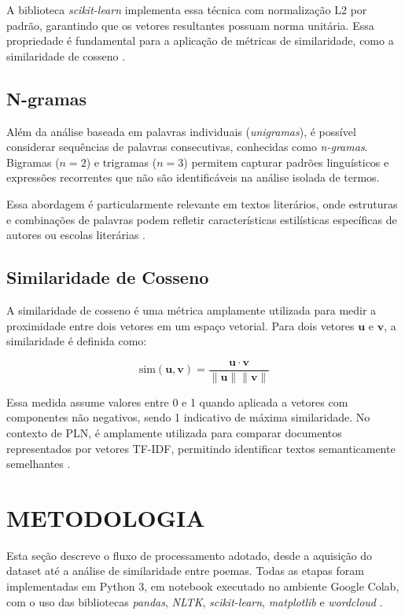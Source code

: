 \documentclass[
	article,
	12pt,
	oneside,
	a4paper,
	english,
	brazil,
	sumario=tradicional
]{abntex2}
\begin{document}
A biblioteca \textit{scikit-learn} implementa essa técnica com normalização L2 por padrão, garantindo que os vetores resultantes possuam norma unitária. Essa propriedade é fundamental para a aplicação de métricas de similaridade, como a similaridade de cosseno \cite{scikit-learn}.

\subsection{N-gramas}

Além da análise baseada em palavras individuais (\textit{unigramas}), é possível considerar sequências de palavras consecutivas, conhecidas como \textit{n-gramas}. Bigramas ($n=2$) e trigramas ($n=3$) permitem capturar padrões linguísticos e expressões recorrentes que não são identificáveis na análise isolada de termos.

Essa abordagem é particularmente relevante em textos literários, onde estruturas e combinações de palavras podem refletir características estilísticas específicas de autores ou escolas literárias \cite{jurafsky2020speech}.

\subsection{Similaridade de Cosseno}

A similaridade de cosseno é uma métrica amplamente utilizada para medir a proximidade entre dois vetores em um espaço vetorial. Para dois vetores $\mathbf{u}$ e $\mathbf{v}$, a similaridade é definida como:

\begin{equation}
\text{sim}(\mathbf{u}, \mathbf{v}) = \frac{\mathbf{u} \cdot \mathbf{v}}{\|\mathbf{u}\| \|\mathbf{v}\|}
\end{equation}

Essa medida assume valores entre 0 e 1 quando aplicada a vetores com componentes não negativos, sendo 1 indicativo de máxima similaridade. No contexto de PLN, é amplamente utilizada para comparar documentos representados por vetores TF-IDF, permitindo identificar textos semanticamente semelhantes \cite{manning2008ir}.

\section{\textbf{METODOLOGIA}}
\label{sec:metodologia}

Esta seção descreve o fluxo de processamento adotado, desde a aquisição do dataset até a análise de similaridade entre poemas. Todas as etapas foram implementadas em Python 3, em notebook executado no ambiente Google Colab, com o uso das bibliotecas \textit{pandas}, \textit{NLTK}, \textit{scikit-learn}, \textit{matplotlib} e \textit{wordcloud} \cite{notebook_colab}.
\end{document}
